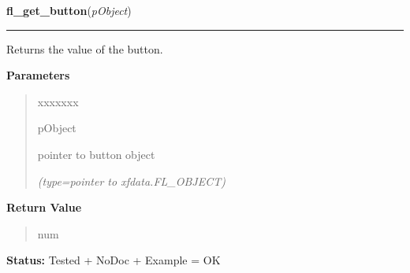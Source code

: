 \hspace{.8\funcindent}\begin{boxedminipage}{\funcwidth}

    \raggedright \textbf{fl\_get\_button}(\textit{pObject})

    \vspace{-1.5ex}

    \rule{\textwidth}{0.5\fboxrule}
\setlength{\parskip}{2ex}
    Returns the value of the button.

\setlength{\parskip}{1ex}
      \textbf{Parameters}
      \vspace{-1ex}

      \begin{quote}
        \begin{Ventry}{xxxxxxx}

          \item[pObject]

          pointer to button object

            {\it (type=pointer to xfdata.FL\_OBJECT)}

        \end{Ventry}

      \end{quote}

      \textbf{Return Value}
    \vspace{-1ex}

      \begin{quote}
      num

      \end{quote}

\textbf{Status:} Tested + NoDoc + Example = OK



    \end{boxedminipage}

    \label{xformslib:library:fl_set_button}

    \vspace{0.5ex}

